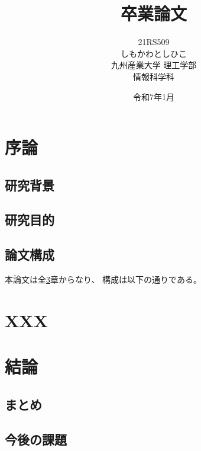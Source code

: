 \documentclass[a4paper,12pt]{ujreport}
\title{
 \Huge{卒業論文}
 \vspace{3.5cm}\\
}
\author{
 \LARGE{21RS509}\vspace{0.5cm}\\
 \LARGE{しもかわとしひこ}\vspace{2cm}\\
 \LARGE{九州産業大学 理工学部}\vspace{0.5cm}\\
 \LARGE{情報科学科}\vspace{1cm}\\
}
\date{\LARGE{令和7年1月}}
\begin{document}
\maketitle
\setcounter{page}{0}
\tableofcontents
\listoffigures
\listoftables
\clearpage
\setcounter{page}{0}


\chapter{序論}\label{chap:joron}

\section{研究背景}\label{sec:haikei}
    
\section{研究目的}\label{sec:mokuteki}

\section{論文構成}\label{sec:kousei}

本論文は全\ref{chap:keturon}章からなり、
構成は以下の通りである。


\chapter{XXX}\label{chap:xxx}


\chapter{結論}\label{chap:keturon}

\section{まとめ}\label{sec:matome}
 
\section{今後の課題}\label{sec:kadai}
\end{document}
